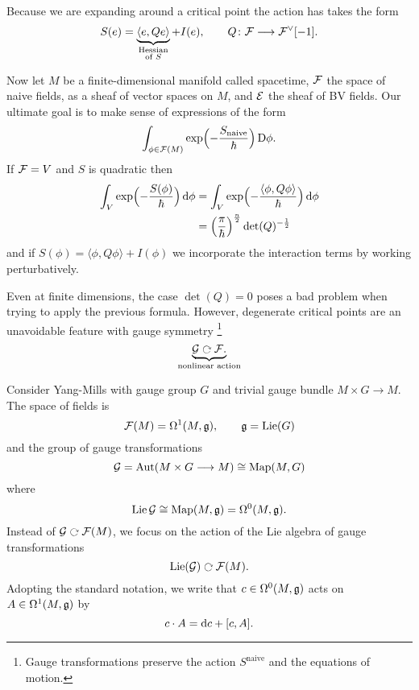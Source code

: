 Because we are expanding around a critical point the action has takes the form
\begin{equation*}
  S(e) = \underbrace{\langle e, Q e \rangle}_{\substack{\text{Hessian} \\ \text{of }S}} + I(e), \qquad
  Q \colon \mathcal{F} \longrightarrow \mathcal{F}^{\vee}[-1].
\end{equation*}

Now let $M$ be a finite-dimensional manifold called spacetime, $\mathcal{F}$ the space of naive fields, as a sheaf of vector spaces on $M$, and $\mathcal{E}$ the sheaf of BV fields.
Our ultimate goal is to make sense of expressions of the form
\begin{equation*}
  \int_{\phi \in \mathcal{F}(M)} \exp \Bigl( - \frac{S_{\text{naive}}}{\hbar} \Bigr) \, \mathrm{D} \phi.
\end{equation*}
If $\mathcal{F} = V$ and $S$ is quadratic then
\begin{align*}
  \int_V \exp \Bigl( - \frac{S(\phi)}{\hbar} \Bigr) \, \mathrm{d} \phi
  &=
  \int_V \exp \Bigl( -\frac{\langle \phi, Q \phi \rangle}{\hbar} \Bigr) \, \mathrm{d} \phi \\
  &=
  \Bigl( \frac{\pi}{\hbar} \Bigr)^{\frac{n}{2}} \det (Q)^{-\frac{1}{2}}
\end{align*}
and if $S(\phi) = \langle \phi, Q \phi \rangle + I(\phi)$ we incorporate the interaction terms by working perturbatively.

Even at finite dimensions, the case $\det (Q) = 0$ poses a bad problem when trying to apply the previous formula.
However, degenerate critical points are an unavoidable feature with gauge symmetry \footnote{Gauge transformations preserve the action $S^{\text{naive}}$ and the equations of motion.}
\begin{equation*}
  \underbrace{\Gcal \acts \Fcal.}_{\text{nonlinear action}}
\end{equation*}

\begin{example}
  Consider Yang-Mills with gauge group $G$ and trivial gauge bundle $M \times G \to M$.
  The space of fields is
  \begin{equation*}
    \mathcal{F}(M) = \Omega^1 (M, \mathfrak{g}), \qquad \mathfrak{g} = \operatorname{Lie} (G)
  \end{equation*}
  and the group of gauge transformations
  \begin{equation*}
    \mathcal{G} = \operatorname{Aut} (M \times G \longrightarrow M)
    \cong \operatorname{Map} (M, G)
  \end{equation*}
  where
  \begin{equation*}
    \operatorname{Lie} \mathcal{G} \cong \operatorname{Map}(M, \mathfrak{g}) = \Omega^0 (M, \mathfrak{g}).
  \end{equation*}
  Instead of $\Gcal \acts \Fcal(M)$, we focus on the action of the Lie algebra of gauge transformations
  \begin{equation*}
    \Lie (\Gcal) \acts \Fcal(M).
  \end{equation*}
  Adopting the standard notation, we write that $c \in \Omega^0 (M, \mathfrak{g})$ acts on $A \in \Omega^1 (M, \mathfrak{g})$ by
  \begin{equation*}
    c \cdot A = \mathrm{d} c + [c, A].
  \end{equation*}
\end{example}

